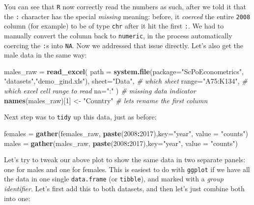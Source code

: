 \documentclass[]{book}
\newenvironment{Shaded}{\begin{snugshade}}{\end{snugshade}}
\newcommand{\CommentTok}[1]{\textcolor[rgb]{0.56,0.35,0.01}{\textit{#1}}}
\newcommand{\DataTypeTok}[1]{\textcolor[rgb]{0.13,0.29,0.53}{#1}}
\newcommand{\DecValTok}[1]{\textcolor[rgb]{0.00,0.00,0.81}{#1}}
\newcommand{\KeywordTok}[1]{\textcolor[rgb]{0.13,0.29,0.53}{\textbf{#1}}}
\newcommand{\NormalTok}[1]{#1}
\newcommand{\OperatorTok}[1]{\textcolor[rgb]{0.81,0.36,0.00}{\textbf{#1}}}
\newcommand{\StringTok}[1]{\textcolor[rgb]{0.31,0.60,0.02}{#1}}
\begin{document}
You can see that \texttt{R} now correctly read the numbers as such, after we told it that the \texttt{:} character has the special \emph{missing} meaning: before, it \emph{coerced} the entire \texttt{2008} column (for example) to be of type \texttt{chr} after it hit the first \texttt{:}. We had to manually convert the column back to \texttt{numeric}, in the process automatically coercing the \texttt{:}s into \texttt{NA}. Now we addressed that issue directly. Let's also get the male data in the same way:

\begin{Shaded}
\begin{Highlighting}[]
\NormalTok{males_raw =}\StringTok{ }\KeywordTok{read_excel}\NormalTok{(}
                \DataTypeTok{path =} \KeywordTok{system.file}\NormalTok{(}\DataTypeTok{package=}\StringTok{"ScPoEconometrics"}\NormalTok{,}
                                    \StringTok{"datasets"}\NormalTok{,}\StringTok{"demo_gind.xls"}\NormalTok{), }
                \DataTypeTok{sheet=}\StringTok{"Data"}\NormalTok{, }\CommentTok{# which sheet}
                \DataTypeTok{range=}\StringTok{"A75:K134"}\NormalTok{,  }\CommentTok{# which excel cell range to read}
                \DataTypeTok{na=}\StringTok{":"}\NormalTok{ )   }\CommentTok{# missing data indicator}
\KeywordTok{names}\NormalTok{(males_raw)[}\DecValTok{1}\NormalTok{] <-}\StringTok{ "Country"}   \CommentTok{# lets rename the first column}
\end{Highlighting}
\end{Shaded}

Next step was to \texttt{tidy} up this data, just as before:

\begin{Shaded}
\begin{Highlighting}[]
\NormalTok{females =}\StringTok{ }\KeywordTok{gather}\NormalTok{(females_raw, }\KeywordTok{paste}\NormalTok{(}\DecValTok{2008}\OperatorTok{:}\DecValTok{2017}\NormalTok{),}\DataTypeTok{key=}\StringTok{"year"}\NormalTok{, }\DataTypeTok{value =} \StringTok{"counts"}\NormalTok{)}
\NormalTok{males =}\StringTok{ }\KeywordTok{gather}\NormalTok{(males_raw, }\KeywordTok{paste}\NormalTok{(}\DecValTok{2008}\OperatorTok{:}\DecValTok{2017}\NormalTok{),}\DataTypeTok{key=}\StringTok{"year"}\NormalTok{, }\DataTypeTok{value =} \StringTok{"counts"}\NormalTok{)}
\end{Highlighting}
\end{Shaded}

Let's try to tweak our above plot to show the same data in two separate panels: one for males and one for females. This is easiest to do with \texttt{ggplot} if we have all the data in one single \texttt{data.frame} (or \texttt{tibble}), and marked with a \emph{group identifier}. Let's first add this to both datasets, and then let's just combine both into one:
\end{document}
